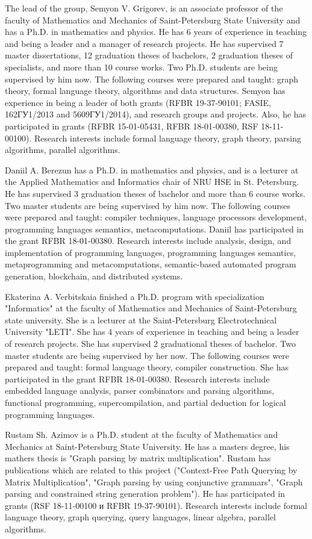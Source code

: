 \documentclass[12pt]{article}  %
\theoremstyle{remark}
\begin{document}
The lead of the group, Semyon V. Grigorev, is an associate professor of the faculty of Mathematics and Mechanics of Saint-Petersburg State University and has a Ph.D. in mathematics and physics.
He has 6 years of experience in teaching and being a leader and a manager of research projects. 
He has supervised 7 master dissertations, 12 graduation theses of bachelors, 2 graduation theses of specialists, and more than 10 course works. 
Two Ph.D. students are being supervised by him now. 
The following courses were prepared and taught: graph theory, formal language theory, algorithms and data structures.
Semyon has experience in being a leader of both grants  (RFBR 19-37-90101; FASIE, 162ГУ1/2013 and 5609ГУ1/2014), and research groups and projects. 
Also, he has participated in grants (RFBR 15-01-05431, RFBR 18-01-00380, RSF 18-11-00100). 
Research interests include formal language theory, graph theory, parsing algorithms, parallel algorithms.

Daniil A. Berezun has a Ph.D. in mathematics and physics, and is a lecturer at the Applied Mathematics and Informatics chair of NRU HSE in St. Petersburg. 
He has supervised 3 graduation theses of bachelor and more than 6 course works. 
Two master students are being supervised by him now.
The following courses were prepared and taught: compiler techniques, language processors development, programming languages semantics, metacomputations.
Daniil has participated in the grant RFBR 18-01-00380. Research interests include analysis, design, and implementation of programming languages, programming languages semantics, metaprogramming and metacomputations, semantic-based automated program generation, blockchain, and distributed systems.

Ekaterina A. Verbitskaia finished a Ph.D. program with specialization "Informatics" at the faculty of Mathematics and Mechanics of Saint-Petersburg state university. She is a lecturer at the Saint-Petersburg Electrotechnical University "LETI".
She has 4 years of experience in teaching and being a leader of research projects. 
She has supervised 2 graduational theses of bachelor. 
Two master students are being supervised by her now. 
The following courses were prepared and taught: formal language theory, compiler construction. 
She has participated in the grant RFBR 18-01-00380.
Research interests include embedded language analysis, parser combinators and parsing algorithms, functional programming, supercompilation, and partial deduction for logical programming languages.

Rustam Sh. Azimov is a Ph.D. student at the faculty of Mathematics and Mechanics at Saint-Petersburg State University.
He has a masters degree, his mathers thesis is "Graph parsing by matrix multiplication". 
Rustam has publications which are related to this project ("Context-Free Path Querying by Matrix Multiplication", "Graph parsing by using conjunctive grammars", "Graph parsing and constrained string generation problem"). 
He has participated in grants (RSF 18-11-00100 и RFBR 19-37-90101).
Research interests include formal language theory, graph querying, query languages, linear algebra, parallel algorithms.
\end{document}
